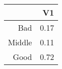 \begin{table}[ht]
\centering
\begin{tabular}{rr}
  \hline
 & V1 \\ 
  \hline
Bad & 0.17 \\ 
  Middle & 0.11 \\ 
  Good & 0.72 \\ 
   \hline
\end{tabular}
\end{table}

